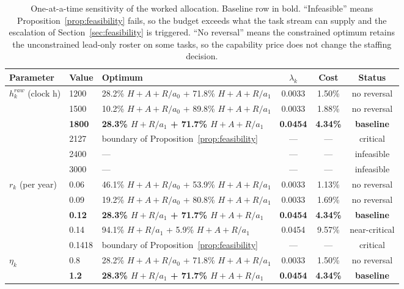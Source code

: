 \documentclass[utf8]{FrontiersinHarvard}
\begin{document}
	\begin{table}[!htbp]
		\caption{One-at-a-time sensitivity of the worked allocation. Baseline row in bold. ``Infeasible'' means Proposition~\ref{prop:feasibility} fails, so the budget exceeds what the task stream can supply and the escalation of Section~\ref{sec:feasibility} is triggered. ``No reversal'' means the constrained optimum retains the unconstrained lead-only roster on some tasks, so the capability price does not change the staffing decision.}
		\label{tab:sensitivity}
		\footnotesize
		\begin{tabularx}{\textwidth}{@{}llXccc@{}}
			\toprule
			\textbf{Parameter} & \textbf{Value} & \textbf{Optimum} & \textbf{$\lambda_k$} & \textbf{Cost} & \textbf{Status}\\
			\midrule
			\multirow{6}{*}{$h^{raw}_k$ (clock h)}
			& 1200 & 28.2\% $H{+}A{+}R/a_0$ + 71.8\% $H{+}A{+}R/a_1$ & 0.0033 & 1.50\% & no reversal\\
			& 1500 & 10.2\% $H{+}A{+}R/a_0$ + 89.8\% $H{+}A{+}R/a_1$ & 0.0033 & 1.88\% & no reversal\\
			& \textbf{1800} & \textbf{28.3\% $H{+}R/a_1$ + 71.7\% $H{+}A{+}R/a_1$} & \textbf{0.0454} & \textbf{4.34\%} & \textbf{baseline}\\
			& 2127 & boundary of Proposition~\ref{prop:feasibility} & --- & --- & critical\\
			& 2400 & --- & --- & --- & infeasible\\
			& 3000 & --- & --- & --- & infeasible\\
			\midrule
			\multirow{5}{*}{$r_k$ (per year)}
			& 0.06 & 46.1\% $H{+}A{+}R/a_0$ + 53.9\% $H{+}A{+}R/a_1$ & 0.0033 & 1.13\% & no reversal\\
			& 0.09 & 19.2\% $H{+}A{+}R/a_0$ + 80.8\% $H{+}A{+}R/a_1$ & 0.0033 & 1.69\% & no reversal\\
			& \textbf{0.12} & \textbf{28.3\% $H{+}R/a_1$ + 71.7\% $H{+}A{+}R/a_1$} & \textbf{0.0454} & \textbf{4.34\%} & \textbf{baseline}\\
			& 0.14 & 94.1\% $H{+}R/a_1$ + 5.9\% $H{+}A{+}R/a_1$ & 0.0454 & 9.57\% & near-critical\\
			& 0.1418 & boundary of Proposition~\ref{prop:feasibility} & --- & --- & critical\\
			\midrule
			\multirow{4}{*}{$\eta_k$}
			& 0.8 & 28.2\% $H{+}A{+}R/a_0$ + 71.8\% $H{+}A{+}R/a_1$ & 0.0033 & 1.50\% & no reversal\\
			& \textbf{1.2} & \textbf{28.3\% $H{+}R/a_1$ + 71.7\% $H{+}A{+}R/a_1$} & \textbf{0.0454} & \textbf{4.34\%} & \textbf{baseline}\\

\end{tabularx}
\end{table}
\end{document}
